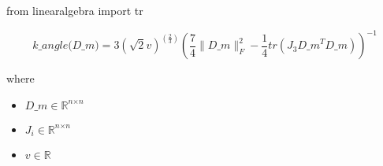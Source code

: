 \documentclass[12pt]{article}
\begin{document}
from linearalgebra import tr

\[
\textit{k\_angle(D\_m)} = 3( \sqrt{2}\textit{v})^{(\frac{2}{3})}(\frac{7}{4}\|\textit{D\_m}\|_F^{2} - \frac{1}{4}tr(\textit{J}_{ 3 }\textit{D\_m}^T\textit{D\_m}))^{-1}
\]

where
\begin{itemize}
\item $\textit{D\_m} \in \mathbb{R}^{ \textit{n} \times \textit{n} }$
\item $\textit{J}_{\textit{i}} \in \mathbb{R}^{ \textit{n} \times \textit{n} }$
\item $\textit{v} \in \mathbb{{R}}$
\end{itemize}
\end{document}
